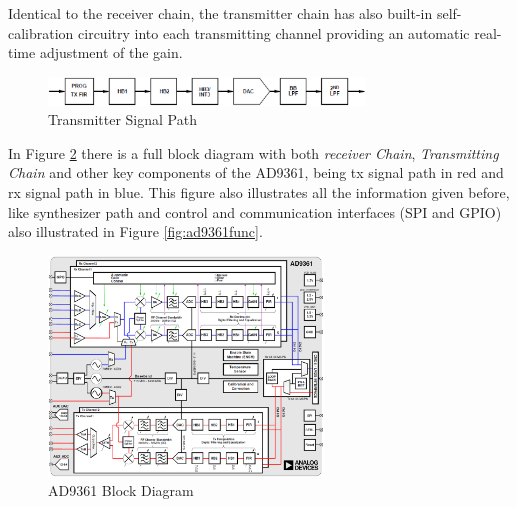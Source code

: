 Identical to the receiver chain, the transmitter chain has also built-in
self-calibration circuitry into each transmitting channel providing an automatic
real-time adjustment of the gain.

\begin{figure}[htbp]
    \centering
    \includegraphics[width=0.75\textwidth]{./figures/tx_chain}
    \caption{ Transmitter Signal Path
    \label{fig:txchain}}
\end{figure}


%

In Figure \ref{fig:ad9361blk} there is a full block diagram with both
\textit{receiver Chain}, \textit{Transmitting Chain} and other key components of
the AD9361, being tx signal path in red and rx signal path in blue. This figure
also illustrates all the information given before, like synthesizer path and
control and communication interfaces (SPI and GPIO) also illustrated in Figure
\ref{fig:ad9361func}.

\begin{figure}[htbp]
    \centering
    \includegraphics[width=0.65\textwidth]{./figures/ad9361_block_diagram}
    \caption{ AD9361 Block Diagram
    \label{fig:ad9361blk}}
\end{figure}

